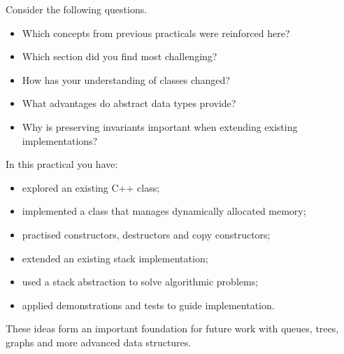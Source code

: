 \documentclass{csc2059practical}
\begin{document}
Consider the following questions.

\begin{itemize}

\item Which concepts from previous practicals were reinforced here?

\item Which section did you find most challenging?

\item How has your understanding of classes changed?

\item What advantages do abstract data types provide?

\item Why is preserving invariants important when extending existing
implementations?

\end{itemize}

\begin{wrapupbox}

In this practical you have:

\begin{itemize}

\item explored an existing C++ class;

\item implemented a class that manages dynamically allocated memory;

\item practised constructors, destructors and copy constructors;

\item extended an existing stack implementation;

\item used a stack abstraction to solve algorithmic problems;

\item applied demonstrations and tests to guide implementation.

\end{itemize}

These ideas form an important foundation for future work with queues,
trees, graphs and more advanced data structures.

\end{wrapupbox}
\end{document}

